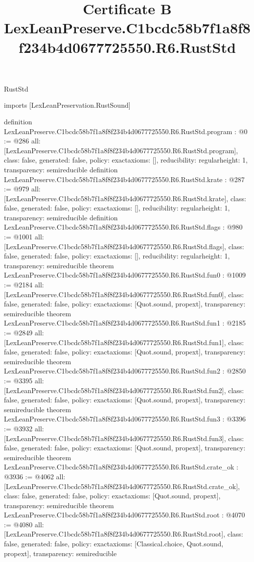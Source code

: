 \begin{lexlean}{RustStd}
\title{Certificate B LexLeanPreserve.C1bcdc58b7f1a8f8f234b4d0677725550.R6.RustStd}
\begin{coremodule}
imports [LexLeanPreservation.RustSound]

definition LexLeanPreserve.C1bcdc58b7f1a8f8f234b4d0677725550.R6.RustStd.program : @0 := @286 {
  all: [LexLeanPreserve.C1bcdc58b7f1a8f8f234b4d0677725550.R6.RustStd.program],
  class: false,
  generated: false,
  policy: exact{axioms: []},
  reducibility: regular{height: 1},
  transparency: semireducible
}
definition LexLeanPreserve.C1bcdc58b7f1a8f8f234b4d0677725550.R6.RustStd.krate : @287 := @979 {
  all: [LexLeanPreserve.C1bcdc58b7f1a8f8f234b4d0677725550.R6.RustStd.krate],
  class: false,
  generated: false,
  policy: exact{axioms: []},
  reducibility: regular{height: 1},
  transparency: semireducible
}
definition LexLeanPreserve.C1bcdc58b7f1a8f8f234b4d0677725550.R6.RustStd.flags : @980 := @1001 {
  all: [LexLeanPreserve.C1bcdc58b7f1a8f8f234b4d0677725550.R6.RustStd.flags],
  class: false,
  generated: false,
  policy: exact{axioms: []},
  reducibility: regular{height: 1},
  transparency: semireducible
}
theorem LexLeanPreserve.C1bcdc58b7f1a8f8f234b4d0677725550.R6.RustStd.fun0 : @1009 := @2184 {
  all: [LexLeanPreserve.C1bcdc58b7f1a8f8f234b4d0677725550.R6.RustStd.fun0],
  class: false,
  generated: false,
  policy: exact{axioms: [Quot.sound, propext]},
  transparency: semireducible
}
theorem LexLeanPreserve.C1bcdc58b7f1a8f8f234b4d0677725550.R6.RustStd.fun1 : @2185 := @2849 {
  all: [LexLeanPreserve.C1bcdc58b7f1a8f8f234b4d0677725550.R6.RustStd.fun1],
  class: false,
  generated: false,
  policy: exact{axioms: [Quot.sound, propext]},
  transparency: semireducible
}
theorem LexLeanPreserve.C1bcdc58b7f1a8f8f234b4d0677725550.R6.RustStd.fun2 : @2850 := @3395 {
  all: [LexLeanPreserve.C1bcdc58b7f1a8f8f234b4d0677725550.R6.RustStd.fun2],
  class: false,
  generated: false,
  policy: exact{axioms: [Quot.sound, propext]},
  transparency: semireducible
}
theorem LexLeanPreserve.C1bcdc58b7f1a8f8f234b4d0677725550.R6.RustStd.fun3 : @3396 := @3932 {
  all: [LexLeanPreserve.C1bcdc58b7f1a8f8f234b4d0677725550.R6.RustStd.fun3],
  class: false,
  generated: false,
  policy: exact{axioms: [Quot.sound, propext]},
  transparency: semireducible
}
theorem LexLeanPreserve.C1bcdc58b7f1a8f8f234b4d0677725550.R6.RustStd.crate_ok : @3936 := @4062 {
  all: [LexLeanPreserve.C1bcdc58b7f1a8f8f234b4d0677725550.R6.RustStd.crate_ok],
  class: false,
  generated: false,
  policy: exact{axioms: [Quot.sound, propext]},
  transparency: semireducible
}
theorem LexLeanPreserve.C1bcdc58b7f1a8f8f234b4d0677725550.R6.RustStd.root : @4070 := @4080 {
  all: [LexLeanPreserve.C1bcdc58b7f1a8f8f234b4d0677725550.R6.RustStd.root],
  class: false,
  generated: false,
  policy: exact{axioms: [Classical.choice, Quot.sound, propext]},
  transparency: semireducible
}


\end{coremodule}
\end{lexlean}
